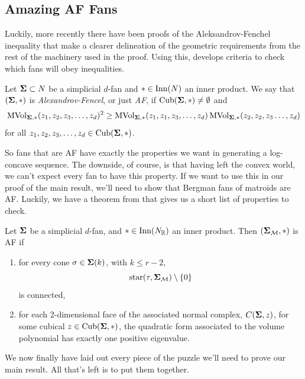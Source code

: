 \documentclass[12pt,oneside]{../../sfsuthesis}
\begin{document}
\subsection{Amazing AF Fans}
Luckily, more recently there have been proofs of the Aleksandrov-Fenchel inequality that make a clearer delineation of the geometric requirements from the rest of the machinery used in the proof.
Using this, \cite{nowakMixedVolumesNormal2023} develops criteria to check which fans will obey inequalities.
\begin{definition}\th\label{def:AF}
    Let \( \bm{\Sigma} \subset N \) be a simplicial \( d \)-fan and \( \ast \in \operatorname{Inn}(N) \) an inner product.
    We say that \( (\bm{\Sigma}, \ast) \) is \emph{Alexandrov-Fencel}, or just \emph{AF}, if \( \operatorname{Cub}(\bm{\Sigma}, \ast) \neq \emptyset \) and
    \[
        \operatorname{MVol}_{\bm{\Sigma}, \ast}(z_1, z_2, z_3, \dots, z_d)^2 \geq  \operatorname{MVol}_{\bm{\Sigma}, \ast}(z_1, z_1, z_3, \dots, z_d)\operatorname{MVol}_{\bm{\Sigma}, \ast}(z_2, z_2, z_3 \dots, z_d)
    \]
    for all \( z_1, z_2, z_3, \dots, z_d \in \operatorname{Cub}(\bm{\Sigma}, \ast) \).
\end{definition}
So fans that are AF have exactly the properties we want in generating a log-concave sequence.
The downside, of course, is that having left the convex world, we can't expect every fan to have this property.
If we want to use this in our proof of the main result, we'll need to show that Bergman fans of matroids are AF.
Luckily, we have a theorem from \cite{nowakMixedVolumesNormal2023} that gives us a short list of properties to check.
\begin{theorem}\th\label{thm:suffAF}
    Let \( \bm{\Sigma} \) be a simplicial  \( d \)-fan, and \( \ast \in \mathrm{Inn}(N_{\mathbb{R}}) \) an inner product.
    Then \( (\bm{\Sigma}_{\mathcal{M}}, \ast) \) is AF if
    \begin{enumerate}[label=\roman*.]
        \item for every cone \( \sigma \in \bm{\Sigma}(k) \), with \( k \leq r - 2 \),
              \[
                  \operatorname{star}(\tau, \bm{\Sigma}_{\mathcal{M}}) \setminus \{ 0 \}
              \]
              is connected,
        \item for each 2-dimensional face of the associated normal complex, \( C(\bm{\Sigma}, z) \), for some cubical \( z \in \operatorname{Cub}(\bm{\Sigma}, \ast) \), the quadratic form associated to the volume polynomial has exactly one positive eigenvalue.
    \end{enumerate}
\end{theorem}
We now finally have laid out every piece of the puzzle we'll need to prove our main result.
All that's left is to put them together.
\end{document}
